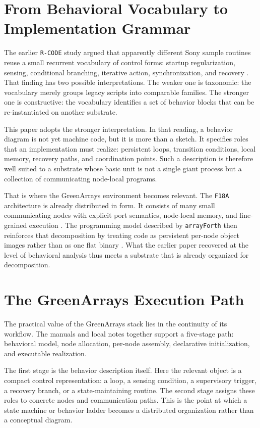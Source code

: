 \documentclass[11pt]{article}
\begin{document}
\section{From Behavioral Vocabulary to Implementation Grammar}

The earlier \texttt{R-CODE} study argued that apparently different Sony
sample routines reuse a small recurrent vocabulary of control forms:
startup regularization, sensing, conditional branching, iterative action,
synchronization, and recovery \citep{tucker2026behavioral}. That finding
has two possible interpretations. The weaker one is taxonomic: the
vocabulary merely groups legacy scripts into comparable families. The
stronger one is constructive: the vocabulary identifies a set of behavior
blocks that can be re-instantiated on another substrate.

This paper adopts the stronger interpretation. In that reading, a behavior
diagram is not yet machine code, but it is more than a sketch. It specifies
roles that an implementation must realize: persistent loops, transition
conditions, local memory, recovery paths, and coordination points. Such a
description is therefore well suited to a substrate whose basic unit is not
a single giant process but a collection of communicating node-local
programs.

That is where the GreenArrays environment becomes relevant. The \texttt{F18A}
architecture is already distributed in form. It consists of many small
communicating nodes with explicit port semantics, node-local memory, and
fine-grained execution \citep{greenarrays2011db001}. The programming model
described by \texttt{arrayForth} then reinforces that decomposition by
treating code as persistent per-node object images rather than as one flat
binary \citep{greenarrays2011db013}. What the earlier paper recovered at
the level of behavioral analysis thus meets a substrate that is already
organized for decomposition.

\section{The GreenArrays Execution Path}

The practical value of the GreenArrays stack lies in the continuity of its
workflow. The manuals and local notes together support a five-stage path:
behavioral model, node allocation, per-node assembly, declarative
initialization, and executable realization.

The first stage is the behavior description itself. Here the relevant object
is a compact control representation: a loop, a sensing condition, a
supervisory trigger, a recovery branch, or a state-maintaining routine. The
second stage assigns these roles to concrete nodes and communication paths.
This is the point at which a state machine or behavior ladder becomes a
distributed organization rather than a conceptual diagram.
\end{document}
